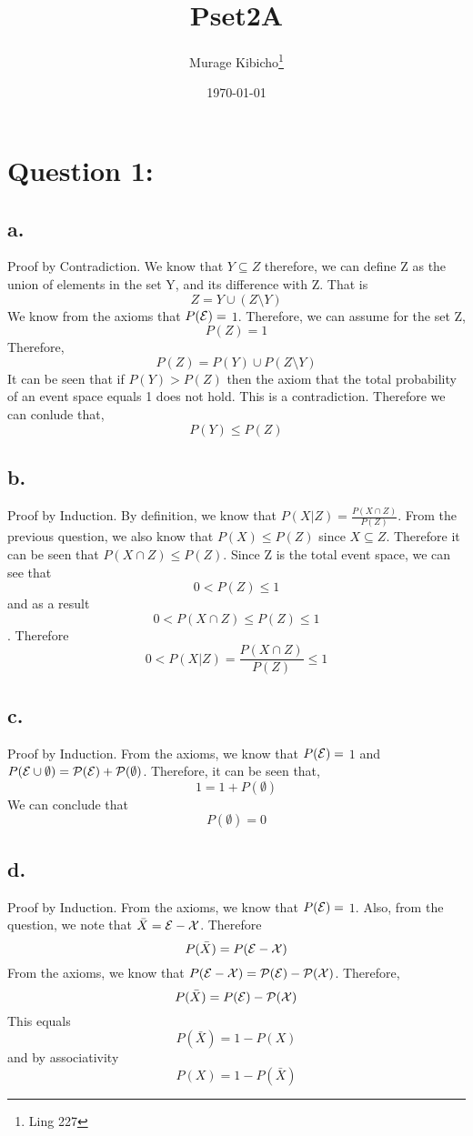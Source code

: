 \documentclass[a4paper,12pt]{article}
\begin{document}
\title{Pset2A}
\author{Murage Kibicho\thanks{Ling 227}}
\date{\today}
\maketitle

\newpage
{}

\section*{Question 1: }
\subsection*{a. }
Proof by Contradiction.$ $
We know that $Y\subseteq Z$ therefore, we can define Z as the union of elements in the set Y, and its difference with Z. That is
$$Z = Y \cup (Z\setminus Y)$$
We know from the axioms that $P(\cal E) = $ $1$. Therefore, we can assume for the set Z, $$P(Z) = 1$$
Therefore, 
$$P(Z) = P(Y) \cup P(Z\setminus Y)$$ It can be seen that if $P(Y) > P(Z)$ then the axiom that the total probability of an event space equals 1 does not hold. This is a contradiction. Therefore we can conlude that,$$P(Y)\leq P(Z)$$
\subsection*{b. }
Proof by Induction.$ $
By definition, we know that $P(X|Z) = \frac{P(X\cap Z)}{P(Z)}$. From the previous question, we also know that $P(X)\leq P(Z)$ since $X\subseteq Z$. Therefore it can be seen that $P(X\cap Z) \leq P(Z)$. Since Z is the total event space, we can see that $$0< P(Z)\leq 1$$ and as a result
$$0 < P(X\cap Z) \leq P(Z)\leq 1$$. Therefore$$0 < P(X|Z) = \frac{P(X\cap Z)}{P(Z)} \leq 1$$
\subsection*{c. }
Proof by Induction.$ $
From the axioms, we know that $P(\cal E) = $ $1$ and $P(\cal E \cup \emptyset) = P(\cal E) + P(\emptyset)$. 
Therefore, it can be seen that, $$1 = 1 +  P(\emptyset)$$ We can conclude that $$P(\emptyset) = 0$$
\subsection*{d. }
Proof by Induction.$ $
From the axioms, we know that $P(\cal E) = $ $1$. Also, from the question, we note that $\bar{X} = \cal E - X$. Therefore$$P(\bar{X}) = P(\cal E - X)$$From the axioms, we know that $P(\cal E - X) = P(\cal E) - P(X)$. Therefore,
$$P(\bar{X}) = P(\cal E) - P(X)$$ This equals $$P(\bar{X}) = 1 - P(X)$$ and by associativity $$P(X) = 1 - P(\bar{X})$$
\end{document}
